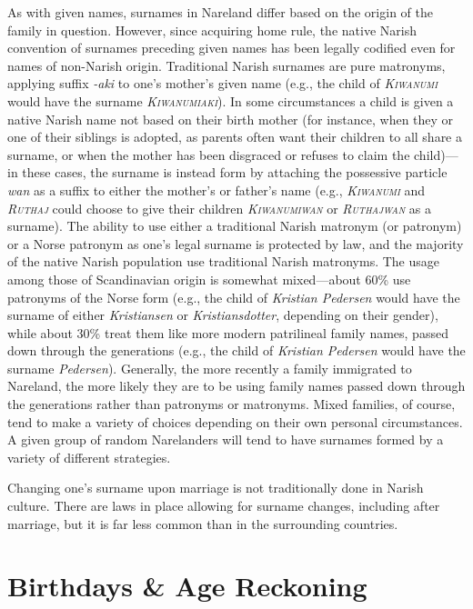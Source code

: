 \documentclass[a4paper,11pt,twoside,openright]{memoir}
\begin{document}
As with given names, surnames in Nareland differ based on the origin of the family in question. However, since acquiring home rule, the native Narish convention of surnames preceding given names has been legally codified even for names of non-Narish origin. Traditional Narish surnames are pure matronyms, applying suffix \textit{-aki} to one's mother's given name (e.g., the child of \textit{\textsc{Kiwanumi}} would have the surname \textsc{\textit{Kiwanumiaki}}). In some circumstances a child is given a native Narish name not based on their birth mother (for instance, when they or one of their siblings is adopted, as parents often want their children to all share a surname, or when the mother has been disgraced or refuses to claim the child)---in these cases, the surname is instead form by attaching the possessive particle \textit{wan} as a suffix to either the mother's or father's name (e.g., \textsc{\textit{Kiwanumi}} and \textsc{\textit{Ruthaj}} could choose to give their children \textit{\textsc{Kiwanumiwan}} or \textit{\textsc{Ruthajwan}} as a surname). The ability to use either a traditional Narish matronym (or patronym) or a Norse patronym as one's legal surname is protected by law, and the majority of the native Narish population use traditional Narish matronyms. The usage among those of Scandinavian origin is somewhat mixed---about 60\% use patronyms of the Norse form (e.g., the child of \textit{Kristian Pedersen} would have the surname of either \textit{Kristiansen} or \textit{Kristiansdotter}, depending on their gender), while about 30\% treat them like more modern patrilineal family names, passed down through the generations (e.g., the child of \textit{Kristian Pedersen} would have the surname \textit{Pedersen}). Generally, the more recently a family immigrated to Nareland, the more likely they are to be using family names passed down through the generations rather than patronyms or matronyms. Mixed families, of course, tend to make a variety of choices depending on their own personal circumstances. A given group of random Narelanders will tend to have surnames formed by a variety of different strategies.

Changing one's surname upon marriage is not traditionally done in Narish culture. There are laws in place allowing for surname changes, including after marriage, but it is far less common than in the surrounding countries. 

\chapter{Birthdays \& Age Reckoning}
\end{document}
